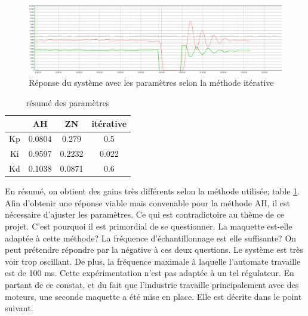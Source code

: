 \begin{figure}[h]
	\centering
	\includegraphics[width=\linewidth]{img/Reglage PID methode au cul}
	\caption{Réponse du système avec les paramètres selon la méthode itérative}
	\label{fig:Réponse du système avec les paramètres selon la méthode itérative}
\end{figure}

\begin{table}
	\centering
	
\begin{tabular}{|c|c|c|c|}
	\hline
	& AH & ZN & itérative \\
	\hline
	Kp&  0.0804 & 0.279 & 0.5 \\
	\hline
	Ki& 0.9597 & 0.2232 & 0.022 \\
	\hline
	Kd& 0.1038 & 0.0871 & 0.6 \\
	\hline
	
\end{tabular}
\caption{résumé des paramètres}
\label{tab:résumé des paramètres}
\end{table}

En résumé, on obtient des gains très différents selon la méthode utilisée; table \ref{tab:résumé des paramètres}. Afin d'obtenir une réponse viable mais convenable pour la méthode AH, il est nécessaire d'ajuster les paramètres. Ce qui est contradictoire au thème de ce projet. C'est pourquoi il est primordial de se questionner. La maquette est-elle adaptée à cette méthode? La fréquence d'échantillonnage est elle suffisante? On peut prétendre répondre par la négative à ces deux questions. Le système est très voir trop oscillant. De plus, la fréquence maximale à laquelle l'automate travaille est de 100 ms. Cette expérimentation n'est pas adaptée à un tel régulateur. En partant de ce constat, et du fait que l'industrie travaille principalement avec des moteurs, une seconde maquette a été mise en place. Elle est décrite dans le point suivant.